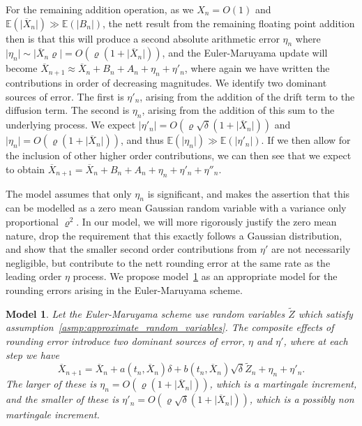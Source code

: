 \documentclass[manuscript,review]{acmart}
\newtheorem{model}{Model}[section]
\begin{document}
For the remaining addition operation, as we $ X_n = O(1) $ and $ \mathbb{E}(\lvert \overline{X}_n \rvert)  \gg \mathbb{E}(\lvert B_n \rvert)  $, the nett result from the remaining floating point addition then is that this will produce a second absolute arithmetic error $ \eta_n $ where $ \lvert \eta_n \rvert  \sim \lvert  \overline{X}_n \varrho \rvert = O(\varrho (1 + \lvert \overline{X}_n\rvert ))$, and the Euler-Maruyama update will become
$ \overline{X}_{n+1} \approx \overline{X}_n + B_n + A_n + \eta_n + \eta'_n $, 
where again we have written the contributions in order of decreasing magnitudes. We identify two dominant sources of error. The first is $ \eta'_n $, arising from the addition of the drift term to the diffusion term. The second is $ \eta_n $, arising from the addition of this sum to the underlying process.  We expect $ \lvert \eta'_n\rvert  = O(\varrho\sqrt{\delta} (1 + \lvert \overline{X}_n\rvert ))$ and $ \lvert \eta_n\rvert = O(\varrho (1 + \lvert \overline{X}_n\rvert ))$, and thus $ \mathbb{E}(\lvert \eta_n\rvert)  \gg \mathbb{E}(\lvert \eta'_n\rvert ) $.  If we then allow for the inclusion of other higher order contributions, we can then see that we expect to obtain
$ \overline{X}_{n+1} = \overline{X}_n + B_n + A_n + \eta_n + \eta'_n + \eta''_n $.

The \citet{arciniega2003rounding} model assumes that only $ \eta_n $ is significant, and makes the assertion that this can be modelled as a zero mean Gaussian random variable with a variance only proportional $ \varrho^2 $. In our model, we will more rigorously justify the zero mean nature, drop the requirement that this exactly follows a Gaussian distribution, and show that the smaller second order contributions from $ \eta' $ are not necessarily negligible, but contribute to the nett rounding error at the same rate as the leading order $ \eta $ process. We propose model~\ref{model:rounding_errors} as an appropriate model for the rounding errors arising in the Euler-Maruyama scheme.  

\begin{model}
\label{model:rounding_errors}
Let the Euler-Maruyama scheme use random variables $ \widetilde{Z} $ which satisfy assumption~\ref{asmp:approximate_random_variables}. The composite effects of rounding error introduce two dominant sources of error, $ \eta $ and $ \eta' $, where at each step we have 
\begin{equation*}
\overline{X}_{n+1} = \overline{X}_n + a(t_n, \overline{X}_n) \delta +  b(t_n, \overline{X}_n) \sqrt{\delta} \widetilde{Z}_n + \eta_n + \eta'_n.
\end{equation*}
The larger of these is $ \eta_n = O(\varrho (1 + \lvert\overline{X}_n\rvert)) $, which is a martingale increment, and the smaller of these  is $ \eta'_n = O(\varrho\sqrt{\delta} (1 + \lvert \overline{X}_n\rvert)) $, which is a possibly non martingale increment.
\end{model}
\end{document}
